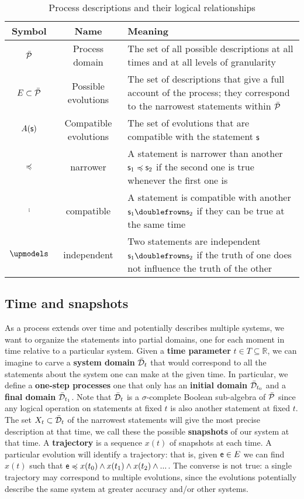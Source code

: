 \documentclass[letterpaper]{article}
\begin{document}
\begin{table}[h!]
	\centering
\begin{tabular}[h]{|c|c|p{6cm}|}
	\hline 
	Symbol & Name & Meaning \\ 
	\hline 
	$\tdomain[P]$ & Process domain & The set of all possible descriptions at all times and at all levels of granularity \\ 
	\hline 
	$E \subset \tdomain[P]$ & Possible evolutions & The set of descriptions that give a full account of the process; they correspond to the narrowest statements within $\tdomain[P]$ \\ 
	\hline 
	$A(\stmt)$ & Compatible evolutions & The set of evolutions that are compatible with the statement $\stmt$ \\ 
	\hline 
	$\narrower$ & narrower & A statement is narrower than another $\stmt_1 \narrower \stmt_2$ if the second one is true whenever the first one is \\ 
	\hline 
	$\comp$ & compatible & A statement is compatible with another $\stmt_1 \comp \stmt_2$ if they can be true at the same time \\ 
	\hline 
	$\indep$ & independent & Two statements are independent  $\stmt_1 \comp \stmt_2$ if the truth of one does not influence the truth of the other \\ 
\hline 
\end{tabular} 
	\caption{Process descriptions and their logical relationships}
	\label{table:logic}
\end{table}


\subsection{Time and snapshots}

As a process extends over time and potentially describes multiple systems, we want to organize the statements into partial domains, one for each moment in time relative to a particular system. Given a \textbf{time parameter} $t \in T \subseteq \mathbb{R}$, we can imagine to carve a \textbf{system domain} $\tdomain_t$ that would correspond to all the statements about the system one can make at the given time. In particular, we define a \textbf{one-step processes} one that only has an \textbf{initial domain} $\tdomain_{t_0}$ and a \textbf{final domain} $\tdomain_{t_1}$. Note that $\tdomain_t$ is a $\sigma$-complete Boolean sub-algebra of $\tdomain[P]$ since any logical operation on statements at fixed $t$ is also another statement at fixed $t$. The set $X_t \subset \tdomain_t$ of the narrowest statements will give the most precise description at that time, we call these the  possible \textbf{snapshots} of our system at that time. A \textbf{trajectory} is a sequence $x(t)$ of snapshots at each time. A particular evolution will identify a trajectory: that is, given $\stmt[e] \in E$ we can find $x(t)$ such that $\stmt[e] \narrower x(t_0) \AND x(t_1) \AND x(t_2) \AND ... $. The converse is not true: a single trajectory may correspond to multiple evolutions, since the evolutions potentially describe the same system at greater accuracy and/or other systems.
\end{document}
